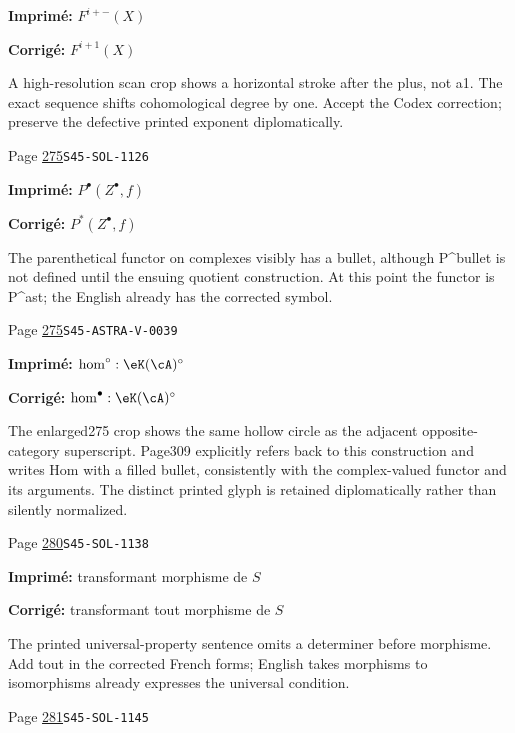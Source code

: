 \begin{description}
\par\noindent\textbf{Imprimé:} \(F^{i+-}(X)\)
\par\noindent\textbf{Corrigé:} \(F^{i+1}(X)\)
\par\noindent A high-resolution scan crop shows a horizontal stroke after the plus, not a1. The exact sequence shifts cohomological degree by one. Accept the Codex correction; preserve the defective printed exponent diplomatically.
\smallskip
\item[\hypertarget{apparatus:FR-0283}{283}] Page \hyperlink{printpage:fr:275}{275}\quad\texttt{S45-SOL-1126}
\par\noindent\textbf{Imprimé:} \(P^\bullet(Z^\bullet,f)\)
\par\noindent\textbf{Corrigé:} \(P^\ast(Z^\bullet,f)\)
\par\noindent The parenthetical functor on complexes visibly has a bullet, although P\textasciicircum{}bullet is not defined until the ensuing quotient construction. At this point the functor is P\textasciicircum{}ast; the English already has the corrected symbol.
\smallskip
\item[\hypertarget{apparatus:FR-0284}{284}] Page \hyperlink{printpage:fr:275}{275}\quad\texttt{S45-ASTRA-V-0039}
\par\noindent\textbf{Imprimé:} \(\hom^\circ:\eK(\cA)^\circ\)
\par\noindent\textbf{Corrigé:} \(\hom^\bullet:\eK(\cA)^\circ\)
\par\noindent The enlarged275 crop shows the same hollow circle as the adjacent opposite-category superscript. Page309 explicitly refers back to this construction and writes Hom with a filled bullet, consistently with the complex-valued functor and its arguments. The distinct printed glyph is retained diplomatically rather than silently normalized.
\smallskip
\item[\hypertarget{apparatus:FR-0285}{285}] Page \hyperlink{printpage:fr:280}{280}\quad\texttt{S45-SOL-1138}
\par\noindent\textbf{Imprimé:} transformant morphisme de $S$
\par\noindent\textbf{Corrigé:} transformant tout morphisme de $S$
\par\noindent The printed universal-property sentence omits a determiner before morphisme. Add tout in the corrected French forms; English takes morphisms to isomorphisms already expresses the universal condition.
\smallskip
\item[\hypertarget{apparatus:FR-0286}{286}] Page \hyperlink{printpage:fr:281}{281}\quad\texttt{S45-SOL-1145}

\end{description}
